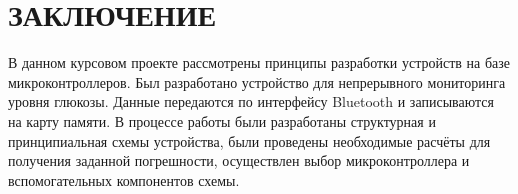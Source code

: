 \begin{sloppypar} %
\newpage %

\section*{ЗАКЛЮЧЕНИЕ} %

В данном курсовом проекте рассмотрены принципы разработки устройств на базе микроконтроллеров. Был разработано устройство для непрерывного мониторинга уровня глюкозы. Данные передаются по интерфейсу Bluetooth и записываются на карту памяти. В процессе работы были разработаны структурная и принципиальная схемы устройства, были проведены необходимые расчёты для получения заданной погрешности, осуществлен выбор микроконтроллера и вспомогательных компонентов схемы. 



\end{sloppypar}
